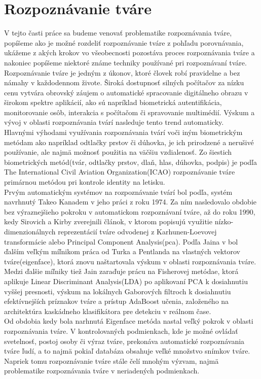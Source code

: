 \section{Rozpoznávanie tváre}\label{l:techn}
V tejto časti práce sa budeme venovať problematike rozpoznávania tváre, popíšeme ako je možné rozdeliť rozpoznávanie tváre z pohľadu porovnávania,
ukážeme z akých krokov vo všeobecnosti pozostáva proces rozpoznávania tváre a nakoniec popíšeme niektoré známe techniky používané pri rozpoznávaní tváre. \\

\indent Rozpoznávanie tváre je jedným z úkonov, ktoré človek robí pravidelne a bez námahy v každodennom živote.
Široká dostupnosť silných počítačov za nízku cenu vytvára obrovský záujem o automatické spracovanie digitálneho
obrazu v širokom spektre aplikácií, ako sú napríklad biometrická autentifikácia, monitorovanie osôb,
interakcia s počítačom či spravovanie multimédií.
Výskum a vývoj v oblasti rozpoznávania tvárí nasleduje tento trend
automaticky.\\
\indent Hlavnými výhodami využívania rozpoznávania tvárí voči iným biometrickým metódam ako napríklad odtlačky prstov či dúhovka,
je ich prirodzené a nerušivé používanie, ale najmä možnosť použitia na väčšiu vzdialenosť. Zo šiestich biometrických metód(tvár, odtlačky prstov, dlaň, hlas, dúhovka, podpis)
je podľa The International Civil Aviation Organization(ICAO)\cite{icao} rozpoznávanie tváre primárnou metódou pri kontrole identity na letisku.\\
\indent Prvým automatickým systémov na rozpoznávanie tvárí bol podľa\cite{handbookface}, systém navrhnutý Takeo Kanadem v jeho práci\cite{kanade1974} z roku 1974.
Za ním nasledovalo obdobie bez výraznejšieho pokroku v automatickom rozpoznávaní tváre, až do roku 1990, kedy Sirovich a Kirby zverejnili článok\cite{kirby1990application},
v ktorom popisujú využitie nízko-dimenzionálnych reprezentácií tváre odvodenej z Karhunen-Loevovej transformácie alebo Principal Component Analysis(\acrshort{pca}).
Podľa Jaina v\cite{handbookface} bol ďalším veľkým míľnikom práca\cite{turk1991eigenfaces} od Turka a Pentlanda na vlastných vektorov tváre(eigenface),
ktorá znovu naštartovala výskum v oblasti rozpoznávania tváre. Medzi ďalšie míľniky tiež Jain zaraďuje prácu na Fisherovej metódae\cite{belhumeur1997eigenfaces},
ktorá aplikuje Linear Discriminant Analysis(LDA) po aplikovaní PCA k dosiahnutiu vyššej presnosti, výskum na lokálnych Gaborových filtroch\cite{wiskott1997face}
k dosiahnutiu efektívnejších príznakov tváre a prístup AdaBoost učenia, založeného na architektúra kaskádneho klasifikátora pre detekciu v reálnom čase\cite{viola2001rapid}.\\
\indent Od obdobia kedy bola narhnutá Eigenface metóda nastal veľký pokrok v oblasti rozpoznávania tváre.
V kontrolovaných podmienkach, kde je možné ovládať svetelnosť,
postoj osoby či výraz tváre, prekonáva automatické rozpoznávania tváre ľudí, a to najmä pokiaľ databáza obsahuje veľké množstvo snímkov tváre.
Napriek tomu rozpoznávanie tváre
stále čelí mnohým výzvam, najmä problematike rozpoznávania tváre v neriadených podmienkach.

